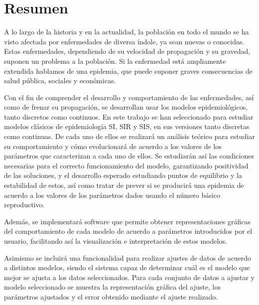 

\chapter*{Resumen}


A lo largo de la historia y en la actualidad, la población en todo el mundo se ha visto afectada por enfermedades de diversa índole, ya sean nuevas o conocidas. Estas enfermedades, dependiendo de su velocidad de propagación y su gravedad, suponen un problema a la población. Si la enfermedad está ampliamente extendida hablamos de una epidemia, que puede suponer graves consecuencias de salud pública, sociales y económicas.

Con el fin de comprender el desarrollo y comportamiento de las enfermedades, así como de frenar su propagación, se desarrollan usar los modelos epidemiológicos, tanto discretos como continuos. En este trabajo se han seleccionado para estudiar modelos clásicos de epidemiología SI, SIR y SIS, en sus versiones tanto discretas como continuas. De cada uno de ellos se realizará un análisis teórico para estudiar su comportamiento y cómo evolucionará de acuerdo a los valores de los parámetros que caracterizan a cada uno de ellos. Se estudiarán así las condiciones necesarias para el correcto funcionamiento del modelo, garantizando positividad de las soluciones, y el desarrollo esperado estudiando puntos de equilibrio y la estabilidad de estos, así como tratar de prever si se producirá una epidemia de acuerdo a los valores de los parámetros dados usando el número básico reproductivo.

Además, se implementará software que permite obtener representaciones gráficas del comportamiento de cada modelo de acuerdo a parámetros introducidos por el usuario, facilitando así la visualización e interpretación de estos modelos.

Asimismo se incluirá una funcionalidad para realizar ajustes de datos de acuerdo a distintos modelos, siendo el sistema capaz de determinar cuál es el modelo que mejor se ajusta a los datos seleccionados. Para cada conjunto de datos a ajustar y modelo seleccionado se muestra la representación gráfica del ajuste, los parámetros ajustados y el error obtenido mediante el ajuste realizado.

